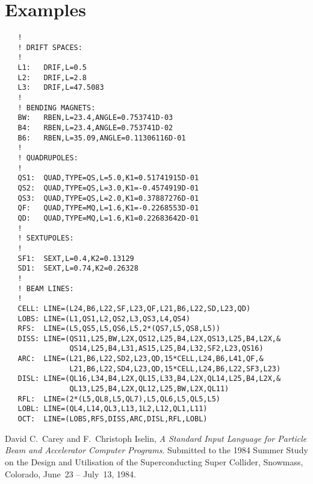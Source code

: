 \documentclass{article}
\begin{document}
\section{Examples}
\begin{verbatim}
   !
   ! DRIFT SPACES:
   !
   L1:   DRIF,L=0.5
   L2:   DRIF,L=2.8
   L3:   DRIF,L=47.5083
   !
   ! BENDING MAGNETS:
   BW:   RBEN,L=23.4,ANGLE=0.753741D-03
   B4:   RBEN,L=23.4,ANGLE=0.753741D-02
   B6:   RBEN,L=35.09,ANGLE=0.11306116D-01
   !
   ! QUADRUPOLES:
   !
   QS1:  QUAD,TYPE=QS,L=5.0,K1=0.51741915D-01
   QS2:  QUAD,TYPE=QS,L=3.0,K1=-0.4574919D-01
   QS3:  QUAD,TYPE=QS,L=2.0,K1=0.37887276D-01
   QF:   QUAD,TYPE=MQ,L=1.6,K1=-0.2268553D-01
   QD:   QUAD,TYPE=MQ,L=1.6,K1=0.22683642D-01
   !
   ! SEXTUPOLES:
   !
   SF1:  SEXT,L=0.4,K2=0.13129
   SD1:  SEXT,L=0.74,K2=0.26328
   !
   ! BEAM LINES:
   !
   CELL: LINE=(L24,B6,L22,SF,L23,QF,L21,B6,L22,SD,L23,QD)
   LOBS: LINE=(L1,QS1,L2,QS2,L3,QS3,L4,QS4)
   RFS:  LINE=(L5,QS5,L5,QS6,L5,2*(QS7,L5,QS8,L5))
   DISS: LINE=(QS11,L25,BW,L2X,QS12,L25,B4,L2X,QS13,L25,B4,L2X,&
               QS14,L25,B4,L31,AS15,L25,B4,L32,SF2,L23,QS16)
   ARC:  LINE=(L21,B6,L22,SD2,L23,QD,15*CELL,L24,B6,L41,QF,&
               L21,B6,L22,SD4,L23,QD,15*CELL,L24,B6,L22,SF3,L23)
   DISL: LINE=(QL16,L34,B4,L2X,QL15,L33,B4,L2X,QL14,L25,B4,L2X,&
               QL13,L25,B4,L2X,QL12,L25,BW,L2X,QL11)
   RFL:  LINE=(2*(L5,QL8,L5,QL7),L5,QL6,L5,QL5,L5)
   LOBL: LINE=(QL4,L14,QL3,L13,1L2,L12,QL1,L11)
   OCT:  LINE=(LOBS,RFS,DISS,ARC,DISL,RFL,LOBL)
\end{verbatim}

\clearpage
\begin{thebibliography}{99}
David C.~Carey and F.~Christoph Iselin,
{\em A Standard Input Language for Particle Beam and Accelerator
  Computer Programs}.
Submitted to the 1984 Summer Study on the Design and Utilisation of
the Superconducting Super Collider, Snowmass, Colorado, June~23 --
July~13, 1984.
\end{thebibliography}
\end{document}
